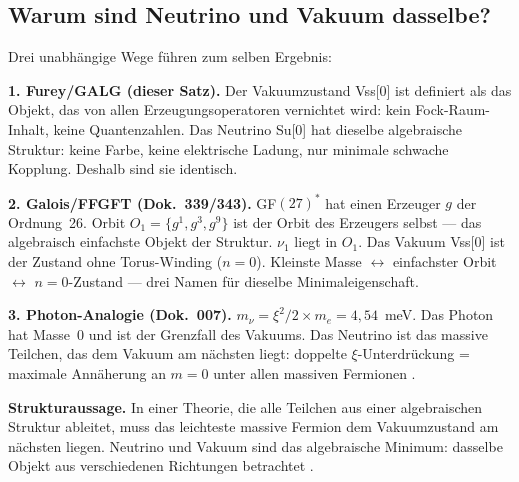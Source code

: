 \subsection*{Warum sind Neutrino und Vakuum dasselbe?}

Drei unabhängige Wege führen zum selben Ergebnis:

\textbf{1. Furey/GALG (dieser Satz).}
Der Vakuumzustand Vss[0] ist definiert als das Objekt, das von allen
Erzeugungsoperatoren vernichtet wird: kein Fock-Raum-Inhalt, keine
Quantenzahlen. Das Neutrino Su[0] hat dieselbe algebraische Struktur:
keine Farbe, keine elektrische Ladung, nur minimale schwache Kopplung.
Deshalb sind sie identisch.

\textbf{2. Galois/FFGFT (Dok.~339/343).}
GF$(27)^*$ hat einen Erzeuger $g$ der Ordnung~26.
Orbit $O_1 = \{g^1, g^3, g^9\}$ ist der Orbit des Erzeugers selbst ---
das algebraisch einfachste Objekt der Struktur. $\nu_1$ liegt in $O_1$.
Das Vakuum Vss[0] ist der Zustand ohne Torus-Winding ($n=0$).
Kleinste Masse $\leftrightarrow$ einfachster Orbit $\leftrightarrow$ $n=0$-Zustand
--- drei Namen für dieselbe Minimaleigenschaft.

\textbf{3. Photon-Analogie (Dok.~007).}
$m_\nu = \xi^2/2 \times m_e = 4{,}54$~meV. Das Photon hat Masse~0
und ist der Grenzfall des Vakuums. Das Neutrino ist das massive Teilchen,
das dem Vakuum am nächsten liegt: doppelte $\xi$-Unterdrückung
= maximale Annäherung an $m=0$ unter allen massiven Fermionen \KM.

\textbf{Strukturaussage.}
In einer Theorie, die alle Teilchen aus einer algebraischen Struktur ableitet,
muss das leichteste massive Fermion dem Vakuumzustand am nächsten liegen.
Neutrino und Vakuum sind das algebraische Minimum: dasselbe Objekt aus
verschiedenen Richtungen betrachtet \BM.


